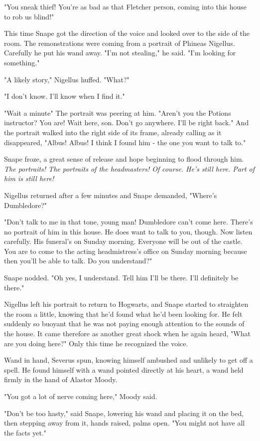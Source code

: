"You sneak thief! You're as bad as that Fletcher person, coming into this house to rob us blind!"

This time Snape got the direction of the voice and looked over to the side of the room. The remonstrations were coming from a portrait of Phineas Nigellus. Carefully he put his wand away. "I'm not stealing," he said. "I'm looking for something."

"A likely story," Nigellus huffed. "What?"

"I don't know. I'll know when I find it."

"Wait a minute{\el}" The portrait was peering at him. "Aren't you the Potions instructor? You are! Wait here, son. Don't go anywhere. I'll be right back." And the portrait walked into the right side of its frame, already calling as it disappeared, "Albus! Albus! I think I found him - the one you want to talk to."

Snape froze, a great sense of release and hope beginning to flood through him. \emph{The portraits! The portraits of the headmasters! Of course. He's still here. Part of him is still here!}

Nigellus returned after a few minutes and Snape demanded, "Where's Dumbledore?"

"Don't talk to me in that tone, young man! Dumbledore can't come here. There's no portrait of him in this house. He does want to talk to you, though. Now listen carefully. His funeral's on Sunday morning. Everyone will be out of the castle. You are to come to the acting headmistress's office on Sunday morning because then you'll be able to talk. Do you understand?"

Snape nodded. "Oh yes, I understand. Tell him I'll be there. I'll definitely be there."

Nigellus left his portrait to return to Hogwarts, and Snape started to straighten the room a little, knowing that he'd found what he'd been looking for. He felt suddenly so buoyant that he was not paying enough attention to the sounds of the house. It came therefore as another great shock when he again heard, "What are you doing here?" Only this time he recognized the voice.

Wand in hand, Severus spun, knowing himself ambushed and unlikely to get off a spell. He found himself with a wand pointed directly at his heart, a wand held firmly in the hand of Alastor Moody.

"You got a lot of nerve coming here," Moody said.

"Don't be too hasty," said Snape, lowering his wand and placing it on the bed, then stepping away from it, hands raised, palms open. "You might not have all the facts yet."

